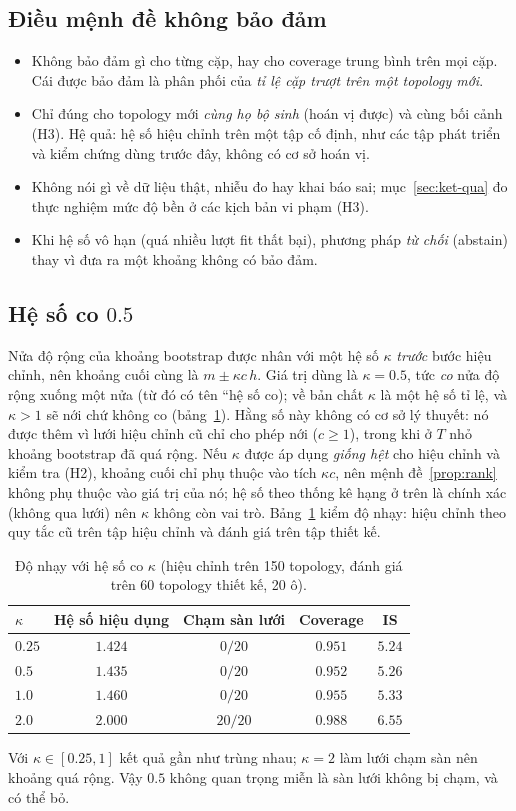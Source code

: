 \subsection{Điều mệnh đề không bảo đảm}
\begin{itemize}
  \item Không bảo đảm gì cho từng cặp, hay cho coverage trung bình trên mọi cặp. Cái được bảo đảm là phân phối của \emph{tỉ lệ cặp trượt trên một topology mới}.
  \item Chỉ đúng cho topology mới \emph{cùng họ bộ sinh} (hoán vị được) và cùng bối cảnh (H3). Hệ quả: hệ số hiệu chỉnh trên một tập cố định, như các tập phát triển và kiểm chứng dùng trước đây, không có cơ sở hoán vị.
  \item Không nói gì về dữ liệu thật, nhiễu đo hay khai báo sai; mục~\ref{sec:ket-qua} đo thực nghiệm mức độ bền ở các kịch bản vi phạm (H3).
  \item Khi hệ số vô hạn (quá nhiều lượt fit thất bại), phương pháp \emph{từ chối} (abstain) thay vì đưa ra một khoảng không có bảo đảm.
\end{itemize}

\subsection{Hệ số co $0.5$}\label{sec:prescale}
Nửa độ rộng của khoảng bootstrap được nhân với một hệ số $\kappa$ \emph{trước} bước hiệu chỉnh, nên khoảng cuối cùng là $m\pm\kappa c\,h$. Giá trị dùng là $\kappa=0.5$, tức \emph{co} nửa độ rộng xuống một nửa (từ đó có tên ``hệ số co); về bản chất $\kappa$ là một hệ số tỉ lệ, và $\kappa>1$ sẽ nới chứ không co (bảng~\ref{tab:prescale}). Hằng số này không có cơ sở lý thuyết: nó được thêm vì lưới hiệu chỉnh cũ chỉ cho phép nới ($c\ge1$), trong khi ở $T$ nhỏ khoảng bootstrap đã quá rộng. Nếu $\kappa$ được áp dụng \emph{giống hệt} cho hiệu chỉnh và kiểm tra (H2), khoảng cuối chỉ phụ thuộc vào tích $\kappa c$, nên mệnh đề~\ref{prop:rank} không phụ thuộc vào giá trị của nó; hệ số theo thống kê hạng ở trên là chính xác (không qua lưới) nên $\kappa$ không còn vai trò. Bảng~\ref{tab:prescale} kiểm độ nhạy: hiệu chỉnh theo quy tắc cũ trên tập hiệu chỉnh và đánh giá trên tập thiết kế.

\begin{table}[H]
\centering\small
\begin{tabular}{lcccc}
\toprule
$\kappa$ & Hệ số hiệu dụng & Chạm sàn lưới & Coverage & IS\\
\midrule
$0.25$ & $1.424$ & $0/20$ & $0.951$ & $5.24$\\
$0.5$ & $1.435$ & $0/20$ & $0.952$ & $5.26$\\
$1.0$ & $1.460$ & $0/20$ & $0.955$ & $5.33$\\
$2.0$ & $2.000$ & $20/20$ & $0.988$ & $6.55$\\
\bottomrule
\end{tabular}
\caption{Độ nhạy với hệ số co $\kappa$ (hiệu chỉnh trên 150 topology, đánh giá trên 60 topology thiết kế, 20 ô).}\label{tab:prescale}
\end{table}
Với $\kappa\in[0.25,1]$ kết quả gần như trùng nhau; $\kappa=2$ làm lưới chạm sàn nên khoảng quá rộng. Vậy $0.5$ không quan trọng miễn là sàn lưới không bị chạm, và có thể bỏ.
